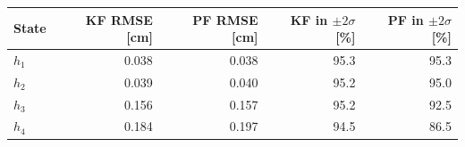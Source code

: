 \begin{tabular}{lrrrr}
\toprule
State & KF RMSE [cm] & PF RMSE [cm] & KF in $\pm2\sigma$ [\%] & PF in $\pm2\sigma$ [\%] \\
\midrule
$h_1$ & 0.038 & 0.038 & 95.3 & 95.3 \\
$h_2$ & 0.039 & 0.040 & 95.2 & 95.0 \\
$h_3$ & 0.156 & 0.157 & 95.2 & 92.5 \\
$h_4$ & 0.184 & 0.197 & 94.5 & 86.5 \\
\bottomrule
\end{tabular}
